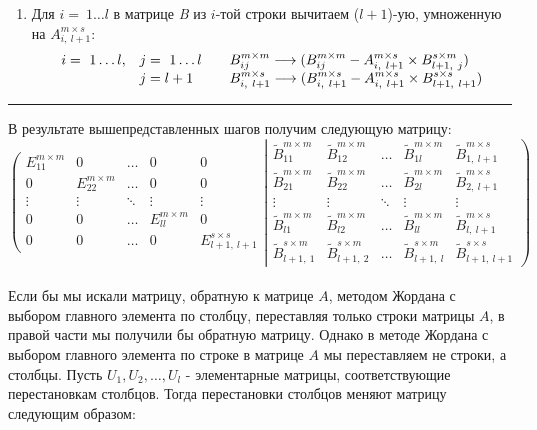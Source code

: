 \documentclass[14pt,a4paper, openany]{article}
\begin{document}
\begin{enumerate}
\item Для $i =\ 1 \ldots l$ в матрице \textit{B} из $i$-той строки вычитаем ($l+1$)-ую, умноженную на $A _{i,\ l+1}^{m \times s}$: \\
$$
\begin{array}{l l l}
i =\ 1 \ldots l, & j =\ 1 \ldots l
  & \quad B _{ij}^{m \times m} \longrightarrow (B _{ij}^{m \times m} - A _{i,\ l+1}^{m \times s} \times  B _{l+1,\ j}^{s \times m}) \\
 & j = l+1  &  \quad B _{i,\ l+1}^{m \times s} \longrightarrow (B _{i,\ l+1}^{m \times s} - A _{i,\ l+1}^{m \times s} \times  B _{l+1,\ l+1}^{s \times s}) \\
\end{array}
$$
\end{enumerate}

\noindent\rule{\textwidth}{1pt}
\indent В результате вышепредставленных шагов получим следующую матрицу:\\
$$
\left (
\begin{matrix} 
E_{11}^{m \times m} & 0 & \ldots & 0 & 0 \\
0 & E_{22}^{m \times m} & \ldots & 0 & 0 \\
\vdots  & \vdots & \ddots & \vdots & \vdots \\
0 & 0 & \ldots & E_{ll}^{m \times m} & 0 \\
0 & 0 & \ldots & 0 & E_{l+1,\ l+1}^{s \times s}
\end{matrix}
\right .
\left |
\begin{matrix} 
\tilde B_{11}^{m \times m} & \tilde B_{12}^{m \times m} & \ldots & \tilde B_{1l}^{m \times m} & \tilde B_{1,\ l+1}^{m \times s} \\
\tilde B_{21}^{m \times m} & \tilde B_{22}^{m \times m} & \ldots & \tilde B_{2l}^{m \times m} & \tilde B_{2,\ l+1}^{m \times s} \\
\vdots  & \vdots & \ddots & \vdots & \vdots \\
\tilde B_{l1}^{m \times m} & \tilde B_{l2}^{m \times m} & \ldots & \tilde B_{ll}^{m \times m} & \tilde B_{l,\ l+1}^{m \times s} \\
\tilde B_{l+1,\ 1}^{s \times m} & \tilde B_{l+1,\ 2}^{s \times m} & \ldots & \tilde B_{l+1,\ l}^{s \times m} & \tilde B_{l+1,\ l+1}^{s \times s}
\end{matrix}
\right )
$$\\
\indent Если бы мы искали матрицу, обратную к матрице $A$, методом Жордана с выбором главного элемента по столбцу, переставляя только строки матрицы $A$, в правой части мы получили бы обратную матрицу. Однако в методе Жордана с выбором главного элемента по строке в матрице $A$ мы переставляем не строки, а столбцы. Пусть $U_1, U_2,\ldots, U_l$ - элементарные матрицы, соответствующие перестановкам столбцов. Тогда перестановки столбцов меняют матрицу следующим образом:\\ \\
\end{document}
